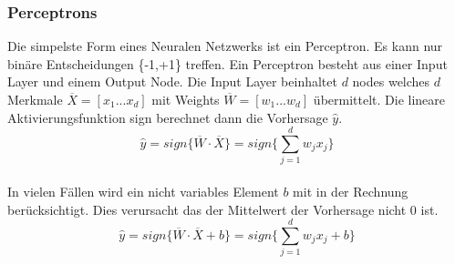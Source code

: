 
\subsubsection{Perceptrons}
Die simpelste Form eines Neuralen Netzwerks ist ein Perceptron. Es kann nur binäre Entscheidungen \{-1,+1\} treffen. Ein Perceptron besteht aus einer Input Layer und einem Output Node.
Die Input Layer beinhaltet $d$ nodes welches $d$ Merkmale $\overline{X} = [x_1...x_d]$ mit Weights $\overline{W} = [w_1...w_d]$ übermittelt. Die lineare Aktivierungsfunktion sign berechnet
dann die Vorhersage $\hat{y}$. \\
$$\hat{y} = sign\{\overline{W} \cdot \overline{X}\} = sign\{\sum\limits^{d}_{j=1}w_jx_j\}$$\\
In vielen Fällen wird ein nicht variables Element $b$ mit in der Rechnung berücksichtigt. Dies verursacht das der Mittelwert der Vorhersage nicht 0 ist.\\
$$\hat{y} = sign\{\overline{W} \cdot \overline{X} + b\} = sign\{\sum\limits^{d}_{j=1}w_jx_j + b\}$$\\
